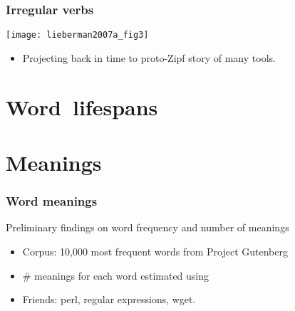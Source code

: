 
\begin{frame}
  \frametitle{Irregular verbs}

  \begin{block}{}
  \texttt{[image: lieberman2007a\_fig3]}

  \begin{itemize}
  \item Projecting back in time to proto-Zipf story of many tools.
  \end{itemize}
  \end{block}

\end{frame}

\section{Word\ lifespans}

\section{Meanings}

\begin{frame}
  \frametitle{Word meanings}

  \begin{block}{Preliminary findings on word frequency and number of meanings}
    \begin{itemize}
    \item 
      Corpus: 10,000 most frequent words from Project Gutenberg
    \item 
      \# meanings for each word estimated using 
    \item 
      Friends: perl, regular expressions, wget.
    \end{itemize}
  \end{block}

\end{frame}

